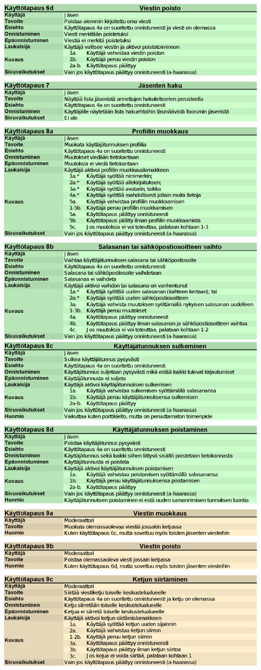\documentclass[11pt]{article}
\begin{document}
		\includegraphics[trim = 21mm 0mm 0mm 25mm]{kayttotapausmalli-sivu-3.eps}\\
		\includegraphics[trim = 21mm 0mm 0mm 25mm]{kayttotapausmalli-sivu-4.eps}\\
\end{document}
